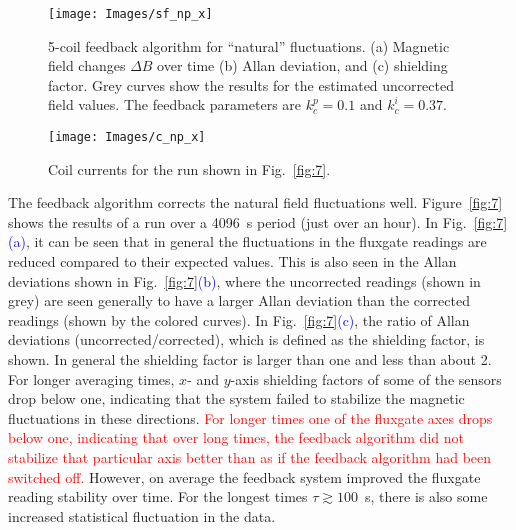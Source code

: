 \begin{figure}
\centering
\texttt{[image: Images/sf\_np\_x]}
\caption[5-coil feedback algorithm for ``natural'' fluctuations]{5-coil feedback algorithm for ``natural'' fluctuations.  (a) Magnetic field changes $\Delta B$ over time (b) Allan deviation, and (c) shielding factor.  Grey curves show the results for the estimated uncorrected field values.  The feedback parameters are $k_c^p=0.1$ and $k_c^i=0.37$.}
\label{fig:7}
\texttt{[image: Images/c\_np\_x]}
\caption{Coil currents for the run shown in Fig.~\ref{fig:7}.}
\label{fig:8}
\end{figure}

The feedback algorithm corrects the natural field fluctuations well.
Figure~\ref{fig:7} shows the results of a run over a 4096~s period
(just over an hour).  In Fig.~\ref{fig:7}\textcolor{blue}{(a)}, it can be seen that in
general the fluctuations in the fluxgate readings are reduced compared
to their expected values.  This is also seen in the Allan deviations
shown in Fig.~\ref{fig:7}\textcolor{blue}{(b)}, where the uncorrected readings (shown in
grey) are seen generally to have a larger Allan deviation than the
corrected readings (shown by the colored curves).  In
Fig.~\ref{fig:7}\textcolor{blue}{(c)}, the ratio of Allan deviations
(uncorrected/corrected), which is defined as the shielding factor, is
shown.  In general the shielding factor is larger than one and less
than about 2.  For longer averaging times, $x$- and $y$-axis shielding factors of some of the sensors drop below one, indicating that the system failed to stabilize the magnetic fluctuations in these directions. \textcolor{red}{For longer times one of the fluxgate axes drops below
one, indicating that over long times, the feedback algorithm did not
stabilize that particular axis better than as if the feedback
algorithm had been switched off.} However, on average the feedback
system improved the fluxgate reading stability over time.  For the
longest times $\tau\gtrsim 100$~s, there is also some increased
statistical fluctuation in the data.

